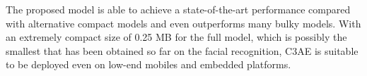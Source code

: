 The proposed model is able to achieve a state-of-the-art performance compared with alternative compact models and even outperforms many 
bulky models. With an extremely compact size of 0.25 MB for the full model, which is possibly the smallest that has been
obtained so far on the facial recognition, C3AE is suitable to be deployed even on low-end mobiles and embedded platforms.

